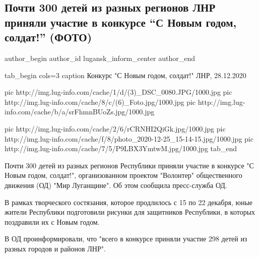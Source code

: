  
 
 
 
 
 
\subsection{Почти 300 детей из разных регионов ЛНР приняли участие в конкурсе \enquote{С Новым годом, солдат!} (ФОТО)}
\label{sec:28_12_2020.news.lnr.lug_info.lugansk_inform_center.1.s_novym_godom_soldat}
\ifcmt
	author_begin
   author_id lugansk_inform_center
	author_end
\fi


\ifcmt
tab_begin cols=3
	caption Конкурс "С Новым годом, солдат!" ЛНР, 28.12.2020

  pic http://img.lug-info.com/cache/1/d/(3)_DSC_0080.JPG/1000.jpg
	pic http://img.lug-info.com/cache/8/c/(6)_Foto.jpg/1000.jpg
	pic http://img.lug-info.com/cache/b/a/srFhmnBUoZs.jpg/1000.jpg
	
	pic http://img.lug-info.com/cache/2/6/rCRNHI2QiGk.jpg/1000.jpg
	pic http://img.lug-info.com/cache/f/8/photo_2020-12-25_15-14-15.jpg/1000.jpg
	pic http://img.lug-info.com/cache/7/5/P9LBX3YmtwM.jpg/1000.jpg
tab_end
\fi


Почти 300 детей из разных регионов Республики приняли участие в конкурсе
"С Новым годом, солдат!", организованном проектом "Волонтер" общественного
движения (ОД) "Мир Луганщине". Об этом сообщила пресс-служба ОД.

В рамках творческого состязания, которое продлилось с 15 по 22 декабря,
юные жители Республики подготовили рисунки для защитников Республики, в
которых поздравили их с Новым годом.

В ОД проинформировали, что "всего в конкурсе приняли участие 298 детей из
разных городов и районов ЛНР".

